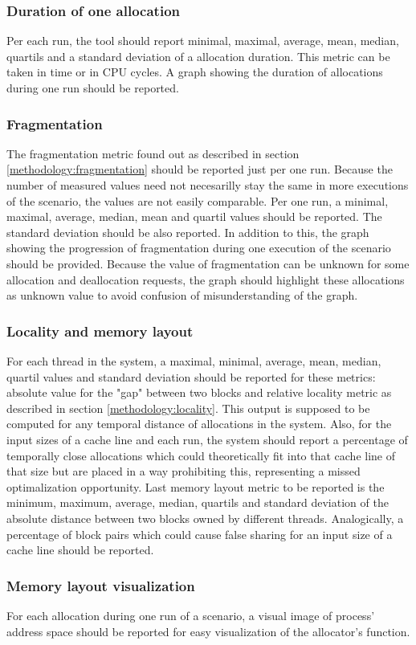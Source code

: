 \subsubsection{Duration of one allocation}
Per each run, the tool should report minimal, maximal, average, mean, median, quartils and a standard deviation of a allocation duration. This metric can be taken in time or in CPU cycles. A graph showing the duration of allocations during one run should be reported.
\subsubsection{Fragmentation} The fragmentation metric found out as described
in section \ref{methodology:fragmentation} should be reported just per one run.
Because the number of measured values need not necesarilly stay the same in more
executions of the scenario, the values are not easily comparable. Per one run, a
minimal, maximal, average, median, mean and quartil values should be reported.
The standard deviation should be also reported. In addition to this, the graph
showing the progression of fragmentation during one execution of the scenario
should be provided. Because the value of fragmentation can be unknown for some
allocation and deallocation requests, the graph should highlight these
allocations as unknown value to avoid confusion of misunderstanding of the graph.
\subsubsection{Locality and memory layout}
For each thread in the system, a maximal,
minimal, average, mean, median, quartil values and standard deviation should be
reported for these metrics: absolute value for the "gap" between two blocks and
relative locality metric as described in section \ref{methodology:locality}. This output
is supposed to be computed for any temporal distance of allocations in the
system. Also, for the input sizes of a cache line and each run, the system should
report a percentage of temporally close allocations which could theoretically fit
into that cache line of that size but are placed in a way prohibiting this,
representing a missed optimalization opportunity. Last memory layout metric to be
reported is the minimum, maximum, average, median, quartils and standard
deviation of the absolute distance between two blocks owned by different threads.
Analogically, a percentage of block pairs which could cause false sharing for an
input size of a cache line should be reported.
\subsubsection{Memory layout visualization}
For each allocation during one run of a scenario, a visual image of process'
address space should be reported for easy visualization of the allocator's
function.

